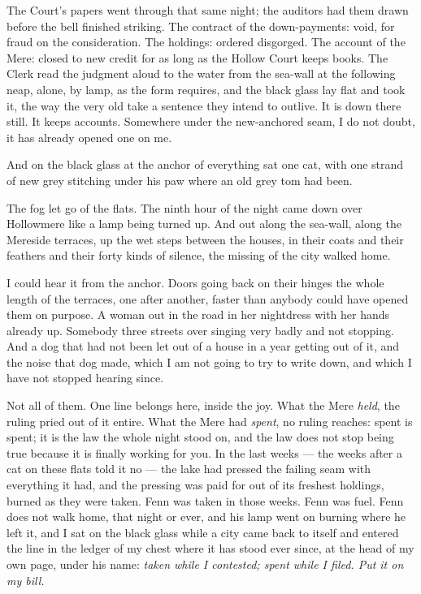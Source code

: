 The Court's papers went through that same night; the auditors had them drawn before the bell finished striking. The contract of the down-payments: void, for fraud on the consideration. The holdings: ordered disgorged. The account of the Mere: closed to new credit for as long as the Hollow Court keeps books. The Clerk read the judgment aloud to the water from the sea-wall at the following neap, alone, by lamp, as the form requires, and the black glass lay flat and took it, the way the very old take a sentence they intend to outlive. It is down there still. It keeps accounts. Somewhere under the new-anchored seam, I do not doubt, it has already opened one on me.

And on the black glass at the anchor of everything sat one cat, with one strand of new grey stitching under his paw where an old grey tom had been.

The fog let go of the flats. The ninth hour of the night came down over Hollowmere like a lamp being turned up. And out along the sea-wall, along the Mereside terraces, up the wet steps between the houses, in their coats and their feathers and their forty kinds of silence, the missing of the city walked home.

I could hear it from the anchor. Doors going back on their hinges the whole length of the terraces, one after another, faster than anybody could have opened them on purpose. A woman out in the road in her nightdress with her hands already up. Somebody three streets over singing very badly and not stopping. And a dog that had not been let out of a house in a year getting out of it, and the noise that dog made, which I am not going to try to write down, and which I have not stopped hearing since.

Not all of them. One line belongs here, inside the joy. What the Mere \emph{held}, the ruling pried out of it entire. What the Mere had \emph{spent}, no ruling reaches: spent is spent; it is the law the whole night stood on, and the law does not stop being true because it is finally working for you. In the last weeks --- the weeks after a cat on these flats told it no --- the lake had pressed the failing seam with everything it had, and the pressing was paid for out of its freshest holdings, burned as they were taken. Fenn was taken in those weeks. Fenn was fuel. Fenn does not walk home, that night or ever, and his lamp went on burning where he left it, and I sat on the black glass while a city came back to itself and entered the line in the ledger of my chest where it has stood ever since, at the head of my own page, under his name: \emph{taken while I contested; spent while I filed. Put it on my bill.}
